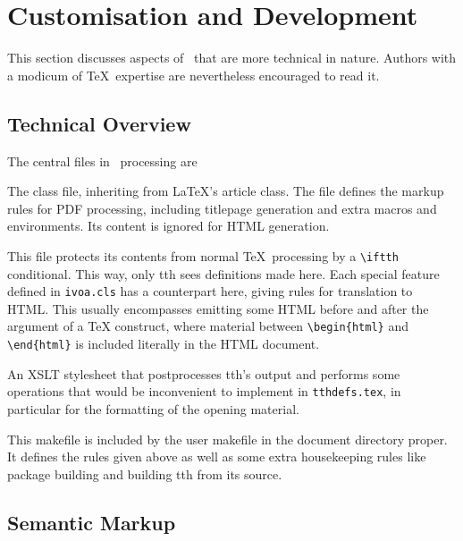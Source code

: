 \documentclass[11pt,a4paper]{ivoa}
\begin{document}
\section{Customisation and Development}
\label{sect:impl}

This section discusses aspects of \ivoatex\ that are more technical in
nature.  Authors with a modicum of \TeX\ expertise are nevertheless
encouraged to read it.

\subsection{Technical Overview}

The central files in \ivoatex\ processing are

\begin{bigdescription}
\item[ivoa.cls] The class file, inheriting from \LaTeX's article class.
The file defines the markup rules for PDF processing, including
titlepage generation and extra macros and environments.  Its content is
ignored for HTML generation.

\item[tthdefs.tex] This file protects its contents from normal \TeX\
processing by a \verb|\iftth| conditional. This way, only tth sees
definitions made here. Each special feature defined in \texttt{ivoa.cls}
has a counterpart here, giving rules for translation to HTML.  This
usually encompasses emitting some HTML before and after the argument of
a TeX construct, where material between \verb|\begin{html}| and
\verb|\end{html}| is included literally in the HTML document.

\item[tth-ivoa.xslt] An XSLT stylesheet that postprocesses tth's output
and performs some operations that would be inconvenient to implement in
\texttt{tthdefs.tex}, in particular for the formatting of the opening
material.

\item[Makefile] This makefile is included by the user makefile in the
document directory proper.  It defines the rules given above as well as
some extra housekeeping rules like package building and building tth
from its source.

\end{bigdescription}

\subsection{Semantic Markup}
\end{document}
